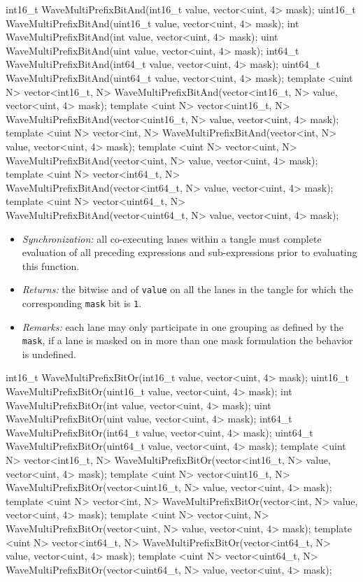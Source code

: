 \begin{HLSL}
int16_t WaveMultiPrefixBitAnd(int16_t value, vector<uint, 4> mask);
uint16_t WaveMultiPrefixBitAnd(uint16_t value, vector<uint, 4> mask);
int WaveMultiPrefixBitAnd(int value, vector<uint, 4> mask);
uint WaveMultiPrefixBitAnd(uint value, vector<uint, 4> mask);
int64_t WaveMultiPrefixBitAnd(int64_t value, vector<uint, 4> mask);
uint64_t WaveMultiPrefixBitAnd(uint64_t value, vector<uint, 4> mask);
template <uint N>
vector<int16_t, N> WaveMultiPrefixBitAnd(vector<int16_t, N> value, vector<uint, 4> mask);
template <uint N>
vector<uint16_t, N> WaveMultiPrefixBitAnd(vector<uint16_t, N> value, vector<uint, 4> mask);
template <uint N>
vector<int, N> WaveMultiPrefixBitAnd(vector<int, N> value, vector<uint, 4> mask);
template <uint N>
vector<uint, N> WaveMultiPrefixBitAnd(vector<uint, N> value, vector<uint, 4> mask);
template <uint N>
vector<int64_t, N> WaveMultiPrefixBitAnd(vector<int64_t, N> value, vector<uint, 4> mask);
template <uint N>
vector<uint64_t, N> WaveMultiPrefixBitAnd(vector<uint64_t, N> value, vector<uint, 4> mask);
\end{HLSL}

\begin{itemize}
  \item \textit{Synchronization:} all co-executing \gls{lane}s within a \gls{tangle}
  must complete evaluation of all preceding expressions and sub-expressions
  prior to evaluating this function.
  \item \textit{Returns:} the bitwise and of \texttt{value} on all the
  \gls{lane}s in the \gls{tangle} for which the corresponding \texttt{mask} bit
  is \texttt{1}.
  \item \textit{Remarks:} each \gls{lane} may only participate in one grouping
  as defined by the \texttt{mask}, if a \gls{lane} is masked on in more than one
  mask formulation the behavior is undefined.
\end{itemize}

\begin{HLSL}
int16_t WaveMultiPrefixBitOr(int16_t value, vector<uint, 4> mask);
uint16_t WaveMultiPrefixBitOr(uint16_t value, vector<uint, 4> mask);
int WaveMultiPrefixBitOr(int value, vector<uint, 4> mask);
uint WaveMultiPrefixBitOr(uint value, vector<uint, 4> mask);
int64_t WaveMultiPrefixBitOr(int64_t value, vector<uint, 4> mask);
uint64_t WaveMultiPrefixBitOr(uint64_t value, vector<uint, 4> mask);
template <uint N>
vector<int16_t, N> WaveMultiPrefixBitOr(vector<int16_t, N> value, vector<uint, 4> mask);
template <uint N>
vector<uint16_t, N> WaveMultiPrefixBitOr(vector<uint16_t, N> value, vector<uint, 4> mask);
template <uint N>
vector<int, N> WaveMultiPrefixBitOr(vector<int, N> value, vector<uint, 4> mask);
template <uint N>
vector<uint, N> WaveMultiPrefixBitOr(vector<uint, N> value, vector<uint, 4> mask);
template <uint N>
vector<int64_t, N> WaveMultiPrefixBitOr(vector<int64_t, N> value, vector<uint, 4> mask);
template <uint N>
vector<uint64_t, N> WaveMultiPrefixBitOr(vector<uint64_t, N> value, vector<uint, 4> mask);
\end{HLSL}

